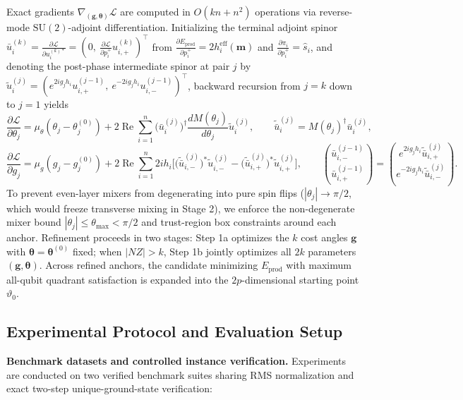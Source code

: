 \documentclass[10pt,a4paper]{article}
\begin{document}
Exact gradients $\nabla_{(\boldsymbol{g}, \boldsymbol{\theta})}\mathcal{L}$ are computed in $O(kn + n^2)$ operations via reverse-mode $\mathrm{SU}(2)$-adjoint differentiation. Initializing the terminal adjoint spinor $\bar{u}_i^{(k)} = \frac{\partial\mathcal{L}}{\partial u_i^{(k)*}} = (0,\ \frac{\partial\mathcal{L}}{\partial p_i^+} u_{i,+}^{(k)})^\top$ from $\frac{\partial E_{\mathrm{prod}}}{\partial p_i^+} = 2 h_i^{\mathrm{eff}}(\boldsymbol{m})$ and $\frac{\partial\pi_i}{\partial p_i^+} = \hat{s}_i$, and denoting the post-phase intermediate spinor at pair $j$ by $\tilde{u}_i^{(j)} = (e^{2i g_j h_i} u_{i,+}^{(j-1)},\ e^{-2i g_j h_i} u_{i,-}^{(j-1)})^\top$, backward recursion from $j = k$ down to $j = 1$ yields
\[
\frac{\partial\mathcal{L}}{\partial\theta_j} = \mu_\theta(\theta_j - \theta_j^{(0)}) + 2\operatorname{Re}\sum_{i=1}^n \big(\bar{u}_i^{(j)}\big)^\dagger \frac{d M(\theta_j)}{d\theta_j} \tilde{u}_i^{(j)}, \qquad \tilde{\bar{u}}_i^{(j)} = M(\theta_j)^\dagger \bar{u}_i^{(j)},
\]
\[
\frac{\partial\mathcal{L}}{\partial g_j} = \mu_g(g_j - g_j^{(0)}) + 2\operatorname{Re}\sum_{i=1}^n 2i h_i \Big[\big(\tilde{\bar{u}}_{i,-}^{(j)}\big)^* \tilde{u}_{i,-}^{(j)} - \big(\tilde{\bar{u}}_{i,+}^{(j)}\big)^* \tilde{u}_{i,+}^{(j)}\Big], \qquad \binom{\bar{u}_{i,-}^{(j-1)}}{\bar{u}_{i,+}^{(j-1)}} = \binom{e^{2i g_j h_i} \tilde{\bar{u}}_{i,+}^{(j)}}{e^{-2i g_j h_i} \tilde{\bar{u}}_{i,-}^{(j)}}.
\]
To prevent even-layer mixers from degenerating into pure spin flips ($|\theta_j| \to \pi/2$, which would freeze transverse mixing in Stage 2), we enforce the non-degenerate mixer bound $|\theta_j| \le \theta_{\max} < \pi/2$ and trust-region box constraints around each anchor. Refinement proceeds in two stages: Step 1a optimizes the $k$ cost angles $\boldsymbol{g}$ with $\boldsymbol{\theta} = \boldsymbol{\theta}^{(0)}$ fixed; when $|NZ| > k$, Step 1b jointly optimizes all $2k$ parameters $(\boldsymbol{g}, \boldsymbol{\theta})$. Across refined anchors, the candidate minimizing $E_{\mathrm{prod}}$ with maximum all-qubit quadrant satisfaction is expanded into the $2p$-dimensional starting point $\vartheta_0$.


\subsection*{Experimental Protocol and Evaluation Setup}

\textbf{Benchmark datasets and controlled instance verification.} Experiments are conducted on two verified benchmark suites sharing RMS normalization and exact two-step unique-ground-state verification:
\end{document}
